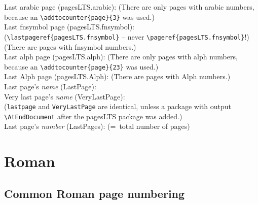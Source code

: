 \documentclass[british]{article}
\def\pagesLTSexampleArabic{3}
\def\pagesLTSexamplealph{23}
\begin{document}
\noindent Last arabic page (pagesLTS.arabic): 
(There are only  pages with arabic numbers,
because an \texttt{\textbackslash addtocounter\{page\}\{\pagesLTSexampleArabic\}} was used.)\\

\noindent Last fnsymbol page (pagesLTS.fnsymbol):  \\
(\texttt{\textbackslash lastpageref\{pagesLTS.fnsymbol\}} -- never
\texttt{\textbackslash pageref\{pagesLTS.fnsymbol\}}!)\\
(There are  pages with fnsymbol numbers.)\\

\noindent Last alph page (pagesLTS.alph): 
(There are only  pages with alph numbers,
because an \texttt{\textbackslash addtocounter\{page\}\{\pagesLTSexamplealph\}} was used.)\\

\noindent Last Alph page (pagesLTS.Alph): 
(There are  pages with Alph numbers.)\\

\noindent Last page's \textit{name} (LastPage): \\

\noindent Very last page's \textit{name} (VeryLastPage): \\
(\texttt{lastpage} and \texttt{VeryLastPage} are identical, unless
a package with output \linebreak
\texttt{\textbackslash AtEndDocument} after the \textsf{pagesLTS} package
was added.)\\

\noindent Last page's \textit{number} (LastPages): 
(=~total number of pages)\\

\lipsum[1-3]

\newpage


\section{Roman\label{Roman}}
\subsection{Common Roman page numbering}
\end{document}

